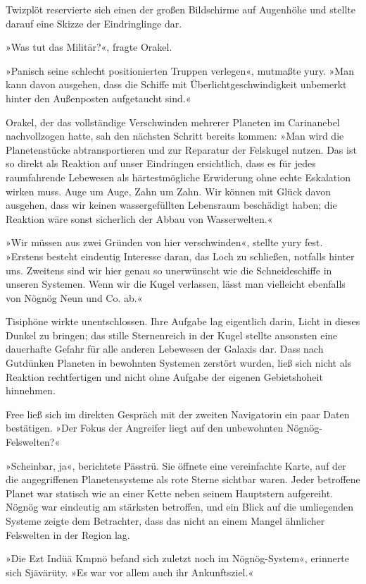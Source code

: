 Twizplöt reservierte sich einen der großen Bildschirme auf Augenhöhe und stellte darauf eine Skizze der Eindringlinge dar.

»Was tut das Militär?«, fragte Orakel.

»Panisch seine schlecht positionierten Truppen verlegen«, mutmaßte yury. »Man kann davon ausgehen, dass die Schiffe mit Überlichtgeschwindigkeit unbemerkt hinter den Außenposten aufgetaucht sind.«

Orakel, der das vollständige Verschwinden mehrerer Planeten im Carinanebel nachvollzogen hatte, sah den nächsten Schritt bereits kommen: »Man wird die Planetenstücke abtransportieren und zur Reparatur der Felskugel nutzen. Das ist so direkt als Reaktion auf unser Eindringen ersichtlich, dass es für jedes raumfahrende Lebewesen als härtestmögliche Erwiderung ohne echte Eskalation wirken muss. Auge um Auge, Zahn um Zahn. Wir können mit Glück davon ausgehen, dass wir keinen wassergefüllten Lebensraum beschädigt haben; die Reaktion wäre sonst sicherlich der Abbau von Wasserwelten.«

»Wir müssen aus zwei Gründen von hier verschwinden«, stellte yury fest. »Erstens besteht eindeutig Interesse daran, das Loch zu schließen, notfalls hinter uns. Zweitens sind wir hier genau so unerwünscht wie die Schneideschiffe in unseren Systemen. Wenn wir die Kugel verlassen, lässt man vielleicht ebenfalls von Nögnög Neun und Co. ab.«

Tisiphöne wirkte unentschlossen. Ihre Aufgabe lag eigentlich darin, Licht in dieses Dunkel zu bringen; das stille Sternenreich in der Kugel stellte ansonsten eine dauerhafte Gefahr für alle anderen Lebewesen der Galaxis dar. Dass nach Gutdünken Planeten in bewohnten Systemen zerstört wurden, ließ sich nicht als Reaktion rechtfertigen und nicht ohne Aufgabe der eigenen Gebietshoheit hinnehmen.

Free ließ sich im direkten Gespräch mit der zweiten Navigatorin ein paar Daten bestätigen. »Der Fokus der Angreifer liegt auf den unbewohnten Nögnög-Felswelten?«

»Scheinbar, ja«, berichtete Pässtrü. Sie öffnete eine vereinfachte Karte, auf der die angegriffenen Planetensysteme als rote Sterne sichtbar waren. Jeder betroffene Planet war statisch wie an einer Kette neben seinem Hauptstern aufgereiht. Nögnög war eindeutig am stärksten betroffen, und ein Blick auf die umliegenden Systeme zeigte dem Betrachter, dass das nicht an einem Mangel ähnlicher Felswelten in der Region lag.

»Die Ezt Indüä Kmpnö befand sich zuletzt noch im Nögnög-System«, erinnerte sich Sjävärüty. »Es war vor allem auch ihr Ankunftsziel.«

